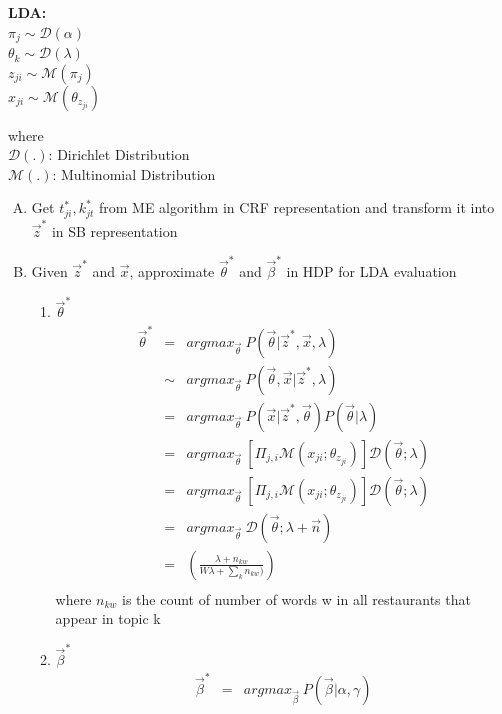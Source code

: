 \documentclass{article}
\begin{document}
\begin{spacing}{1.1}
\begin{enumerate}[(A)]
\begin{table}[ht]
\begin{minipage}[b]{0.5\linewidth}
\begin{center}
{\bf LDA:}\\
$\pi_{j} \sim \mathcal{D}(\alpha)$\\
$\theta_{k} \sim \mathcal{D}(\lambda)$\\
$z_{ji} \sim \mathcal{M}(\pi_{j})$\\
$x_{ji} \sim \mathcal{M}(\theta_{z_{ji}})$\\ 
\end{center}
\end{minipage}
\end{table}
where\\
$\mathcal{D}(.)$: Dirichlet Distribution\\
$\mathcal{M}(.)$: Multinomial Distribution\\
\begin{enumerate}[(A)]
 \item Get $t_{ji}^{*},k_{jt}^{*}$ from ME algorithm in CRF representation and transform it into $\vec z^{*}$ in SB representation
 \item Given $\vec z^{*}$ and $\vec x$, approximate $\vec\theta^{*}$ and $\vec \beta^{*}$ in HDP for LDA evaluation
\begin{enumerate}
\item {\bf $\vec \theta^{*}$}\\
\begin{eqnarray*}
\vec \theta^{*}&=&argmax_{\vec \theta} \ P(\vec \theta|\vec z^{*},\vec x,\lambda)\\
&\sim&argmax_{\vec \theta} \ P(\vec \theta,\vec x|\vec z^{*},\lambda)\\
&=&argmax_{\vec \theta} \ P(\vec x|\vec z^{*},\vec \theta)P(\vec \theta|\lambda)\\
&=&argmax_{\vec \theta} \ [\Pi_{j,i}\mathcal{M}(x_{ji};\theta_{z_{ji}})]\mathcal{D}(\vec \theta;\lambda)\\
&=&argmax_{\vec \theta} \ [\Pi_{j,i}\mathcal{M}(x_{ji};\theta_{z_{ji}})]\mathcal{D}(\vec \theta;\lambda)\\
&=&argmax_{\vec \theta} \ \mathcal{D}(\vec \theta;\lambda+\vec n)\\
&=&(\frac{\lambda+n_{kw}}{W\lambda+\sum_{k}n_{kw})})\\
\end{eqnarray*}
where $n_{kw}$ is the count of number of words w in all restaurants that appear in topic k\\
\item {\bf $\vec \beta^{*}$}
\begin{eqnarray*}
\vec \beta^{*}&=&argmax_{\vec \beta} \ P(\vec \beta|\alpha,\gamma)\\

\end{eqnarray*}
\end{enumerate}
\end{enumerate}
\end{enumerate}
\end{spacing}
\end{document}
